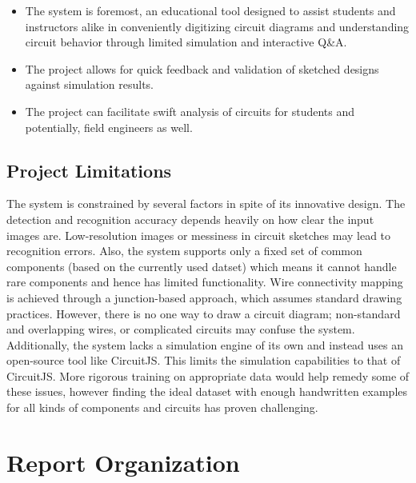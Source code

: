 \begin{itemize}
    \item The system is foremost, an educational tool designed to assist students and instructors alike in conveniently digitizing circuit diagrams and understanding circuit behavior through limited simulation and interactive Q\&A.
    \item The project allows for quick feedback and validation of sketched designs against simulation results.
    \item The project can facilitate swift analysis of circuits for students and potentially, field engineers as well.
\end{itemize}

\subsection{Project Limitations}

The system is constrained by several factors in spite of its innovative design. The detection and recognition accuracy depends heavily on how clear the input images are. Low-resolution images or messiness in circuit sketches may lead to recognition errors. Also, the system supports only a fixed set of common components (based on the currently used datset) which means it cannot handle rare components and hence has limited functionality. Wire connectivity mapping is achieved through a junction-based approach, which assumes standard drawing practices. However, there is no one way to draw a circuit diagram; non-standard and overlapping wires, or complicated circuits may confuse the system. Additionally, the system lacks a simulation engine of its own and instead uses an open-source tool like CircuitJS. This limits the simulation capabilities to that of CircuitJS. More rigorous training on appropriate data would help remedy some of these issues, however finding the ideal dataset with enough handwritten examples for all kinds of components and circuits has proven challenging.

\section{Report Organization}

